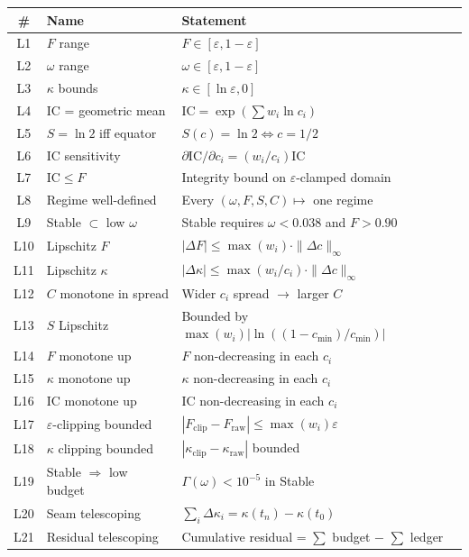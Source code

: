 \documentclass[
  aps,
  prd,
  twocolumn,
  superscriptaddress,
  nofootinbib,
  floatfix
]{revtex4-2}
\newcommand{\Gam}{\Gamma}
\newcommand{\eps}{\varepsilon}
\newcommand{\IC}{\mathrm{IC}}
\begin{document}
\begin{center}
{\small\begin{tabular}{@{}clp{4.0cm}@{}}
\toprule
\textbf{\#} & \textbf{Name} & \textbf{Statement} \\
\midrule
L1 & $F$ range & $F \in [\eps, 1{-}\eps]$ \\
L2 & $\omega$ range & $\omega \in [\eps, 1{-}\eps]$ \\
L3 & $\kappa$ bounds & $\kappa \in [\ln\eps, 0]$ \\
L4 & IC = geometric mean & $\IC = \exp(\sum w_i \ln c_i)$ \\
L5 & $S = \ln 2$ iff equator & $S(c) = \ln 2 \Leftrightarrow c = 1/2$ \\
L6 & IC sensitivity & $\partial\IC/\partial c_i = (w_i/c_i)\IC$ \\
L7 & $\IC \leq F$ & Integrity bound on $\eps$-clamped domain \\
L8 & Regime well-defined & Every $(\omega,F,S,C) \mapsto$ one regime \\
L9 & Stable $\subset$ low $\omega$ & Stable requires $\omega < 0.038$ and $F > 0.90$ \\
L10 & Lipschitz $F$ & $|\Delta F| \leq \max(w_i) \cdot \|\Delta c\|_\infty$ \\
L11 & Lipschitz $\kappa$ & $|\Delta\kappa| \leq \max(w_i/c_i) \cdot \|\Delta c\|_\infty$ \\
L12 & $C$ monotone in spread & Wider $c_i$ spread $\to$ larger $C$ \\
L13 & $S$ Lipschitz & Bounded by $\max(w_i) |\ln((1{-}c_{\min})/c_{\min})|$ \\
L14 & $F$ monotone up & $F$ non-decreasing in each $c_i$ \\
L15 & $\kappa$ monotone up & $\kappa$ non-decreasing in each $c_i$ \\
L16 & $\IC$ monotone up & $\IC$ non-decreasing in each $c_i$ \\
L17 & $\eps$-clipping bounded & $|F_\mathrm{clip} - F_\mathrm{raw}| \leq \max(w_i)\eps$ \\
L18 & $\kappa$ clipping bounded & $|\kappa_\mathrm{clip} - \kappa_\mathrm{raw}|$ bounded \\
L19 & Stable $\Rightarrow$ low budget & $\Gam(\omega) < 10^{-5}$ in Stable \\
L20 & Seam telescoping & $\sum_i \Delta\kappa_i = \kappa(t_n) - \kappa(t_0)$ \\
L21 & Residual telescoping & Cumulative residual = $\sum$ budget $-$ $\sum$ ledger \\

\end{tabular}}
\end{center}
\end{document}
